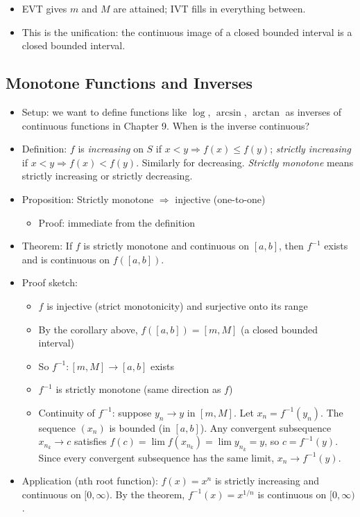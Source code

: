 \documentclass[
  10pt,
  letterpaper,
]{scrbook}
\providecommand{\tightlist}{%
  \setlength{\itemsep}{0pt}\setlength{\parskip}{0pt}}
\begin{document}
\begin{itemize}
  \begin{itemize}
  \tightlist
  \item
    EVT gives \(m\) and \(M\) are attained; IVT fills in everything
    between.
  \item
    This is the unification: the continuous image of a closed bounded
    interval is a closed bounded interval.
  \end{itemize}
\end{itemize}

\subsection{Monotone Functions and
Inverses}\label{monotone-functions-and-inverses}

\begin{itemize}
\tightlist
\item
  Setup: we want to define functions like \(\log\), \(\arcsin\),
  \(\arctan\) as inverses of continuous functions in Chapter 9. When is
  the inverse continuous?
\item
  Definition: \(f\) is \emph{increasing} on \(S\) if
  \(x < y \Rightarrow f(x) \leq f(y)\); \emph{strictly increasing} if
  \(x < y \Rightarrow f(x) < f(y)\). Similarly for decreasing.
  \emph{Strictly monotone} means strictly increasing or strictly
  decreasing.
\item
  Proposition: Strictly monotone \(\Rightarrow\) injective (one-to-one)

  \begin{itemize}
  \tightlist
  \item
    Proof: immediate from the definition
  \end{itemize}
\item
  Theorem: If \(f\) is strictly monotone and continuous on \([a,b]\),
  then \(f^{-1}\) exists and is continuous on \(f([a,b])\).
\item
  Proof sketch:

  \begin{itemize}
  \tightlist
  \item
    \(f\) is injective (strict monotonicity) and surjective onto its
    range
  \item
    By the corollary above, \(f([a,b]) = [m, M]\) (a closed bounded
    interval)
  \item
    So \(f^{-1}: [m, M] \to [a,b]\) exists
  \item
    \(f^{-1}\) is strictly monotone (same direction as \(f\))
  \item
    Continuity of \(f^{-1}\): suppose \(y_n \to y\) in \([m, M]\). Let
    \(x_n = f^{-1}(y_n)\). The sequence \((x_n)\) is bounded (in
    \([a,b]\)). Any convergent subsequence \(x_{n_k} \to c\) satisfies
    \(f(c) = \lim f(x_{n_k}) = \lim y_{n_k} = y\), so \(c = f^{-1}(y)\).
    Since every convergent subsequence has the same limit,
    \(x_n \to f^{-1}(y)\).
  \end{itemize}
\item
  Application (nth root function): \(f(x) = x^n\) is strictly increasing
  and continuous on \([0, \infty)\). By the theorem,
  \(f^{-1}(x) = x^{1/n}\) is continuous on \([0, \infty)\).


\end{itemize}
\end{document}
